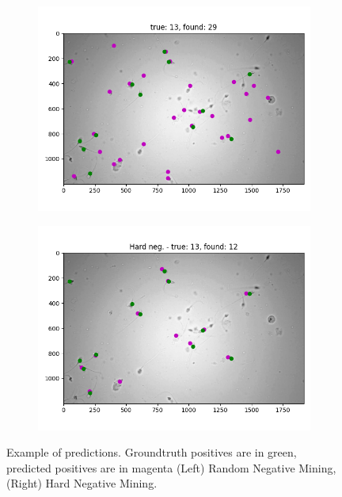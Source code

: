 \documentclass[11pt]{article}
\begin{document}
\begin{figure}
     \centering
     \begin{subfigure}[b]{0.4\textwidth}
         \centering
         \includegraphics[width=\textwidth]{rnd_result_prev.png}
     \end{subfigure}
     \hfill
     \begin{subfigure}[b]{0.4\textwidth}
         \centering
         \includegraphics[width=\textwidth]{hard_result_prev.png}
     \end{subfigure}
        \caption{Example of predictions. Groundtruth positives are in green, predicted positives are in magenta
(Left) Random Negative Mining, (Right) Hard Negative Mining.}
        \label{fig:test_prevs}
\end{figure}
\end{document}
